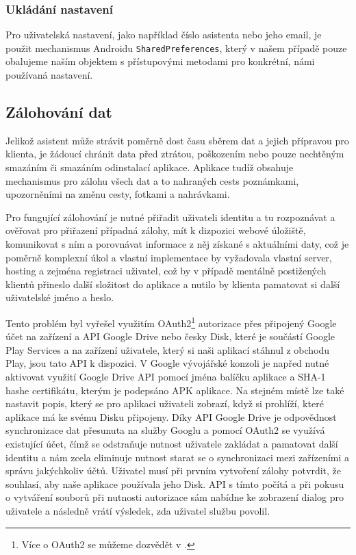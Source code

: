 \documentclass{article}
\begin{document}
\subsubsection{Ukládání nastavení}
Pro uživatelská nastavení, jako například číslo asistenta nebo jeho email, je použit mechanismus Androidu
\texttt{SharedPreferences}, který v našem případě pouze obalujeme naším objektem s přístupovými
metodami pro konkrétní, námi používaná nastavení.

\subsection{Zálohování dat}
Jelikož asistent může strávit poměrně dost času sběrem dat a jejich přípravou pro klienta, je žádoucí chránit data před ztrátou,
poškozením nebo pouze nechtěným smazáním či smazáním odinstalací aplikace. Aplikace tudíž obsahuje mechanismus pro zálohu všech
dat a to nahraných cests poznámkami, upozorněními na změnu cesty, fotkami a nahrávkami.

Pro fungující zálohování je nutné přiřadit uživateli identitu a tu rozpoznávat a ověřovat pro přiřazení případná zálohy,
mít k dizpozici webové úložiště, komunikovat s ním a porovnávat informace z něj získané s aktuálními daty,
což je poměrně komplexní úkol a vlastní implementace by
vyžadovala vlastní server, hosting a zejména registraci uživatel, což by v případě mentálně postižených klientů
přineslo další složitost do aplikace a nutilo by klienta pamatovat si další uživatelské jméno a heslo.

Tento problém byl vyřešel využitím OAuth2\footnote{Více o OAuth2 se můžeme dozvědět v \cite{oauth2}.}
autorizace přes připojený Google účet na zařízení a API Google Drive nebo česky Disk,
 které je součástí Google Play Services a na zařízení uživatele, který si naši aplikací stáhnul z obchodu Play,
 jsou tato API k dispozici.
V Google vývojářské konzoli je napřed nutné aktivovat využití Google Drive API pomocí jména balíčku aplikace a SHA-1 hashe
certifikátu, kterým je podepsáno APK aplikace. Na stejném místě lze také nastavit popis, který se pro aplikaci
uživateli zobrazí, když si prohlíží, které aplikace má ke svému Disku připojeny.
Díky API Google Drive je odpovědnost synchronizace dat přesunuta na služby Googlu a pomocí
OAuth2 se využívá existující účet, čímž se odstraňuje nutnost uživatele zakládat a pamatovat
 další identitu a nám zcela eliminuje nutnost starat se o synchronizaci mezi zařízeními a správu jakýchkoliv účtů.
 Uživatel musí při prvním vytvoření zálohy potvrdit, že souhlasí, aby naše aplikace používala jeho Disk.
 API s tímto počítá a při pokusu o vytváření souborů při nutnosti autorizace sám nabídne ke zobrazení
 dialog pro uživatele a následně vrátí výsledek, zda uživatel službu povolil.
\end{document}
